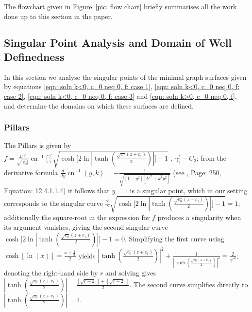\documentclass[12pt]{article}
\theoremstyle{plain}
\theoremstyle{definition}
\theoremstyle{remark}
\begin{document}
 The flowchart given in Figure~\ref{pic: flow chart} briefly summarises all the work done up to this section in the paper.
  
 \subsection{Singular Point Analysis and Domain of Well Definedness}
  In this section we analyse the singular points of the minimal graph surfaces given by equations \ref{eqn: soln k<0, c_0 neq 0, f: case 1}, \ref{eqn: soln k<0, c_0 neq 0, f: case 2}, \ref{eqn: soln k<0, c_0 neq 0, f: case 3} and \ref{eqn: soln k>0, c_0 neq 0, f}, and determine the domains on which these surfaces are defined.
  
  \subsubsection{Pillars}
  The Pillars is given by \footnotesize\(f=\tfrac{\pm \gamma'}{\sqrt{|c_0|}}\operatorname{cn}^{-1}\!\big[\tfrac{\gamma'}{\gamma}\sqrt{\cosh\!\big[2\ln\!|\tanh(\tfrac{\sqrt{c_0}(z + c_1)}{2})|\big]-1}\;,\;\gamma\big]-C_2\)\normalsize; from the derivative formula \(\tfrac{d}{dy}\operatorname{cn}^{-1}(y,k)=-\tfrac{1}{\sqrt{[1-y^2][k'^2+k^2y^2]}}\) (see \cite{JD}, Page: 250, Equation: 12.4.1.1.4) it follows that \(y=1\) is a singular point, which in our setting corresponds to the singular curve \(\tfrac{\gamma'}{\gamma}\sqrt{\cosh\!\big[2\ln\!|\tanh(\tfrac{\sqrt{c_0}(z + c_1)}{2})|\big]-1}=1\); additionally the square‑root in the expression for \(f\) produces a singularity when its argument vanishes, giving the second singular curve \(\cosh\!\big[2\ln\!|\tanh(\tfrac{\sqrt{c_0}(z + c_1)}{2})|\big]-1=0\). Simplifying the first curve using \(\cosh[\ln(x)]=\frac{x+\frac{1}{x}}{2}\) yields \(|\tanh(\tfrac{\sqrt{c_0}(z + c_1)}{2})|^2+\frac{1}{|\tanh(\frac{\sqrt{c_0}(z + c_1)}{2})|^2}=\tfrac{2}{\gamma'^2}\); denoting the right‑hand side by \(r\) and solving gives \(|\tanh(\tfrac{\sqrt{c_0}(z + c_1)}{2})|=\frac{[\sqrt{r+2}\;]\pm[\sqrt{r-2}\;]}{2}\). The second curve simplifies directly to \(|\tanh(\tfrac{\sqrt{c_0}(z + c_1)}{2})|=1\).
\end{document}
